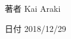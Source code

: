 \begin{DoxyAuthor}{著者}
Kai Araki ~\newline

\end{DoxyAuthor}
\begin{DoxyDate}{日付}
2018/12/29 
\end{DoxyDate}
